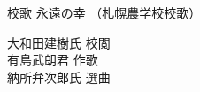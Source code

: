 \documentclass[10pt,b5j]{tarticle} %
\begin{document}
\begin{minipage}[c]{0.7\hsize} %
    \begin{center}
        {\normalsize 
        	校歌
        }
        {\LARGE
            永遠の幸 %
        }
        {\small 
            （札幌農学校校歌） %
        }
    \end{center}
\end{minipage}
\begin{minipage}[c]{0.3\hsize} %
    \begin{flushright} %
        大和田建樹氏 校閲\\有島武朗君 作歌\\納所弁次郎氏 選曲 %
    \end{flushright}
\end{minipage}
\end{document}
